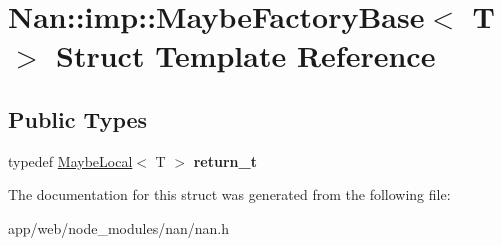 \hypertarget{struct_nan_1_1imp_1_1_maybe_factory_base}{}\section{Nan\+:\+:imp\+:\+:Maybe\+Factory\+Base$<$ T $>$ Struct Template Reference}
\label{struct_nan_1_1imp_1_1_maybe_factory_base}
\subsection*{Public Types}
\begin{DoxyCompactItemize}
\item 
\mbox{\label{struct_nan_1_1imp_1_1_maybe_factory_base_a0cd94515ff3c60a5119331f0c419bc12}} 
typedef \hyperlink{class_nan_1_1_maybe_local}{Maybe\+Local}$<$ T $>$ {\bfseries return\+\_\+t}
\end{DoxyCompactItemize}


The documentation for this struct was generated from the following file\+:\begin{DoxyCompactItemize}
\item 
app/web/node\+\_\+modules/nan/nan.\+h\end{DoxyCompactItemize}
